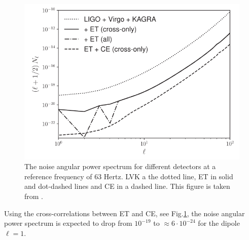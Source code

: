 \begin{figure}[h]
    \centering
    \includegraphics[width=0.7\linewidth]{Images/et_ce_Cl_noise.png}
    \caption[The noise angular power spectrum for different detectors at a reference frequency of 63 Hertz.]{The noise angular power spectrum for different detectors at a reference frequency of 63 Hertz. LVK a the dotted line, ET in solid and dot-dashed lines and CE in a dashed line. This figure is taken from \cite{alonso_noise_2020}.}
    \label{ET_Cl}
\end{figure} 

Using the cross-correlations between ET and CE, see Fig.\ref{ET_Cl}, the noise angular power spectrum is expected to drop from $10^{-19}$ to $\approx 6\cdot 10^{-24}$ for the dipole $\ell =1$.